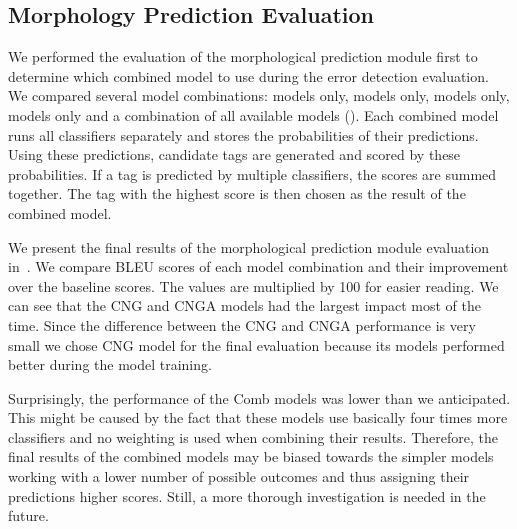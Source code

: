 \subsection{Morphology Prediction Evaluation}

We performed the evaluation of the morphological prediction module first to determine
which combined model to use during the error detection evaluation. We compared
several model combinations:  models only,  models only,  models only, 
 models only and a combination of all available models ().
Each combined model runs all classifiers separately and stores the probabilities of their
predictions. Using these predictions, candidate tags are generated and scored by 
these probabilities. If a tag is predicted by multiple classifiers, the scores are summed together.
The tag with the highest score is then chosen as the result of the combined model.

We present the final results of the morphological prediction module evaluation in~.
We compare BLEU scores of each model combination and their improvement over the baseline scores.
The values are multiplied by 100 for easier reading. We can see that the CNG
and CNGA models had the largest impact most of the time. Since the difference between the CNG and CNGA
performance is very small we chose CNG model for the final evaluation because its models
performed better during the model training.

Surprisingly, the performance of the Comb models was lower than we anticipated. This might be caused
by the fact that these models use basically four times more classifiers and no weighting is used
when combining their results.
Therefore, the final results of the combined models may be biased towards the simpler models working
with
a lower number of possible outcomes and thus assigning
their predictions higher scores. Still, a more thorough
investigation is needed in the future.


